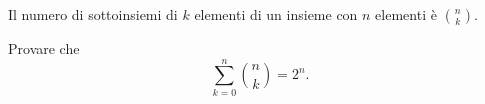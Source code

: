 \documentclass[italian,a4paper,hidelinks,headinclude]{scrartcl}
\newcommand\stripExclamation[1]{
\def\tmp{#1}
\regex_replace_once:nnN { ! } { \  }\tmp
\tmp}
\newcommand{\mynote}[1]{\marginnote{{\footnotesize\stripExclamation{#1}}}}
\newcommand{\myemph}[2][dummy_not_defined]{%
  \emph{\stripExclamation{#2}}%
  \ifthenelse{\equal{#1}{dummy_not_defined}}%
    {\ifthenelse{\isempty{#2}}{}{\mynote{#2}}%
    \index{#2}}%
    {\mynote{#1}%
    \index{#2}}}%
\renewcommand{\vec}[1]{\boldsymbol{#1}}
\begin{document}
\begin{exercise}
Il numero di sottoinsiemi di $k$ elementi di un insieme con $n$ elementi
è ${n\choose k}$.
\end{exercise}

\begin{exercise}
Provare che
\[
 \sum_{k=0}^n {n \choose k} = 2^n.
\]
\end{exercise}


\begin{comment}
\section{spazio vettoriale}

\begin{definition}[campo]
Un campo è un insieme $K$ in cui sono stati fissati due elementi $0,1\in K$
e due operazioni $+$ e $\cdot$ che soddisfano tutte le proprietà
elencate nell'assioma \ref{axiom_field}.
\end{definition}

\begin{definition}
Se $K$ è un campo diremo che $V$ è uno \myemph{spazio vettoriale} su $K$
se è fissato un elemento $\vec 0 \in V$ (vettore nullo da non confondere con
lo zero $0\in K$)
se per ogni coppia $(v,w)\in V\times V$ è definita una operazione di addizione
$v+w$ a valori in $V$
e per ogni coppia $(t,v)\in K \times V$ è definita una operazione
di moltiplicazione scalare $tv$ a valori in $V$ che soddisfano le
seguenti proprietà per ogni $v,w,z\in V$ e $t,s\in K$.
\begin{enumerate}
\item (proprietà associativa) $(v+w)+z = v + (w + z)$;
\item (proprietà commutativa) $v+w = w+v$;
\item (elemento neutro) $v+\vec 0 = v$;
\item (elemento opposto) esiste $-v\in V$ tale che $v+(-v)=\vec 0$;
\item (proprietà distributiva) $t(v+w)=tv + tw$, $(t+s)v = tv + sv$;
\item (compatibilità dei prodotti) $(t\cdot s) v = t(sv)$;
\item (elemento neutro) $1v = v$.
\end{enumerate}

Gli elementi di $V$ vengono chiamati \myemph{vettori}, gli elementi di $K$
vengono chiamati \myemph{scalari}.
\end{definition}


\end{comment}
\end{document}
